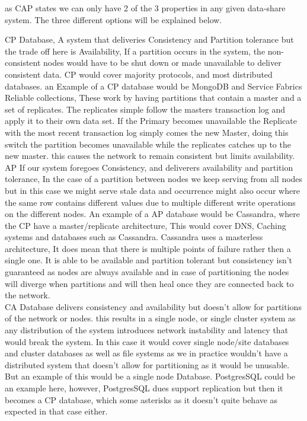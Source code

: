 \documentclass[a4paper,10pt,titlepage]{report}
\begin{document}
as CAP states we can only have 2 of the 3 properties in any given data-share system. The three different options will be explained below.

CP Database, A system that deliveries Consistency and Partition tolerance but the trade off here is Availability, If a partition occurs in the system, the non-consistent nodes would have to be shut down or made unavailable to deliver consistent data. CP would cover majority protocols, and most distributed databases. an Example of a CP database would be MongoDB and Service Fabrics Reliable collections, These work by having partitions that contain a master and a set of replicates. The replicates simple follow the masters transaction log and apply it to their own data set. If the Primary becomes unavailable the Replicate with the most recent transaction log simply comes the new Master, doing this switch the partition becomes unavailable while the replicates catches up to the new master. this causes the network to remain consistent but limits availability.  \\

AP If our system foregoes Consistency, and deliverers availability and partition tolerance, In the case of a partition between nodes we keep serving from all nodes but in this case we might serve stale data and occurrence might also occur where the same row contains different values due to multiple different write operations on the different nodes. An example of a AP database would be Cassandra, where the CP have a master/replicate architecture, This would cover DNS, Caching systems and databases such as Cassandra. Cassandra uses a masterless architecture, It does mean that there is multiple points of failure rather then a single one. It is able to be available and partition tolerant but consistency isn't guaranteed as nodes are always available and in case of partitioning the nodes will diverge when partitions and will then heal once they are connected back to the network.   \\

CA Database delivers consistency and availability but doesn't allow for partitions of the network or nodes. this results in a single node, or single cluster system as any distribution of the system introduces network instability and latency that would break the system. In this case it would cover single node/site databases and cluster databases as well as file systems as we in practice wouldn't have a distributed system that doesn't allow for partitioning as it would be unusable. But an example of this would be a single node Database. PostgresSQL could be an example here, however, PostgresSQL dues support replication but then it becomes a CP database, which some asterisks\cite{aphyrpostgres} as it doesn't quite behave as expected in that case either. \\
\end{document}
